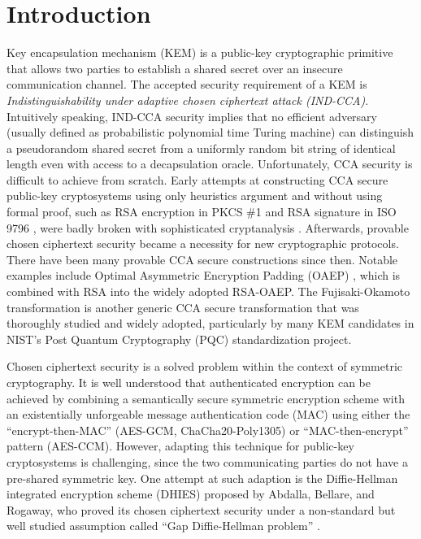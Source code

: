 \documentclass[runningheads]{llncs}
\begin{document}
\section{Introduction}\label{sec:introduction}
Key encapsulation mechanism (KEM) is a public-key cryptographic primitive that allows two parties to establish a shared secret over an insecure communication channel. The accepted security requirement of a KEM is \textit{Indistinguishability under adaptive chosen ciphertext attack (IND-CCA)}. Intuitively speaking, IND-CCA security implies that no efficient adversary (usually defined as probabilistic polynomial time Turing machine) can distinguish a pseudorandom shared secret from a uniformly random bit string of identical length even with access to a decapsulation oracle. Unfortunately, CCA security is difficult to achieve from scratch. Early attempts at constructing CCA secure public-key cryptosystems using only heuristics argument and without using formal proof, such as RSA encryption in PKCS \#1 \cite{DBLP:journals/rfc/rfc2313} and RSA signature in ISO 9796 \cite{ISO9796-1}, were badly broken with sophisticated cryptanalysis \cite{DBLP:conf/crypto/Bleichenbacher98,DBLP:conf/eurocrypt/Grieu00,DBLP:conf/crypto/CoronNS99}. Afterwards, provable chosen ciphertext security became a necessity for new cryptographic protocols. There have been many provable CCA secure constructions since then. Notable examples include Optimal Asymmetric Encryption Padding (OAEP) \cite{DBLP:conf/eurocrypt/BellareR94}, which is combined with RSA \cite{DBLP:conf/crypto/FujisakiOPS01} into the widely adopted RSA-OAEP. The Fujisaki-Okamoto transformation \cite{DBLP:conf/crypto/FujisakiO99,DBLP:conf/tcc/HofheinzHK17} is another generic CCA secure transformation that was thoroughly studied and widely adopted, particularly by many KEM candidates in NIST's Post Quantum Cryptography (PQC) standardization project.

Chosen ciphertext security is a solved problem within the context of symmetric cryptography. It is well understood that authenticated encryption can be achieved by combining a semantically secure symmetric encryption scheme with an existentially unforgeable message authentication code (MAC) using either the ``encrypt-then-MAC'' (AES-GCM, ChaCha20-Poly1305) or ``MAC-then-encrypt'' pattern (AES-CCM)\cite{DBLP:conf/asiacrypt/BellareN00,DBLP:conf/crypto/Krawczyk01}. However, adapting this technique for public-key cryptosystems is challenging, since the two communicating parties do not have a pre-shared symmetric key. One attempt at such adaption is the Diffie-Hellman integrated encryption scheme (DHIES) \cite{DBLP:journals/iacr/AbdallaBR99,DBLP:conf/ctrsa/AbdallaBR01} proposed by Abdalla, Bellare, and Rogaway, who proved its chosen ciphertext security under a non-standard but well studied assumption called ``Gap Diffie-Hellman problem'' \cite{DBLP:conf/pkc/OkamotoP01}.
\end{document}
